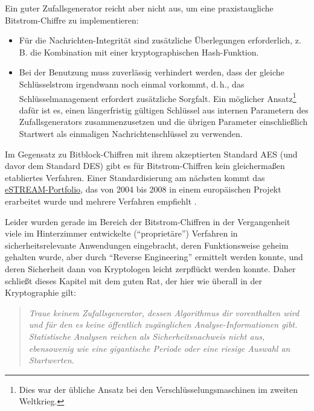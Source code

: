 \begin{refsegment}
Ein guter Zufallsgenerator reicht aber nicht aus, um eine praxistaugliche
Bitstrom-Chiffre zu implementieren:
\begin{itemize}
   \item Für die Nachrichten-Integrität sind zusätzliche
      Überlegungen erforderlich, z.\,B. die Kombination mit einer kryptographischen
      Hash-Funktion.
   \item Bei der Benutzung muss zuverlässig verhindert werden, dass der gleiche
      Schlüsselstrom irgendwann noch einmal vorkommt,
      d.\,h., das Schlüsselmanagement erfordert
      zusätzliche Sorgfalt. Ein möglicher Ansatz\footnote{%
         Dies war der übliche Ansatz bei den Verschlüsselungsmaschinen im zweiten Weltkrieg.
      } dafür ist es, einen längerfristig gültigen Schlüssel aus internen
      Parametern des Zufallsgenerators zusammenzusetzen und die übrigen
      Parameter einschließlich Startwert als einmaligen Nachrichtenschlüssel
      zu verwenden.
\end{itemize}

Im Gegensatz zu Bitblock-Chiffren mit ihrem akzeptierten Standard AES
(und davor dem Standard DES) gibt es für Bitstrom-Chiffren kein gleichermaßen
etabliertes Verfahren. Einer Standardisierung am nächsten kommt
das \href{http://www.ecrypt.eu.org/ecrypt1/stream/}{eSTREAM-Portfolio},
das von 2004 bis 2008 in einem europäischen Projekt erarbeitet
wurde und mehrere Verfahren empfiehlt \cite{Schm2016}.

Leider wurden gerade im Bereich der Bitstrom-Chiffren in der
Vergangenheit viele im Hinterzimmer entwickelte ("`proprietäre"')
Verfahren in sicherheitsrelevante Anwendungen eingebracht,
deren Funktionsweise geheim gehalten wurde, aber durch
"`Reverse Engineering"' ermittelt
werden konnte, und deren Sicherheit dann von Kryptologen leicht
zerpflückt werden konnte. Daher schließt dieses Kapitel mit
dem guten Rat, der hier wie überall in der Kryptographie gilt:

\begin{quote}
   {\em Traue keinem Zufallsgenerator, dessen Algorithmus dir
   vorenthalten wird und für den es keine öffentlich zugänglichen
   Analyse-Informationen gibt. Statistische Analysen reichen als
   Sicherheitsnachweis nicht aus, ebensowenig wie eine gigantische
   Periode oder eine riesige Auswahl an Startwerten.}
\end{quote}



\end{refsegment}
